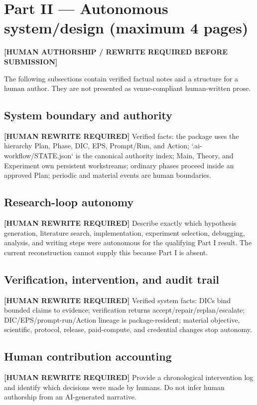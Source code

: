 \documentclass{article}
\begin{document}
\newpage
\section*{Part II --- Autonomous system/design (maximum 4 pages)}
\begin{center}\textbf{[HUMAN AUTHORSHIP / REWRITE REQUIRED BEFORE SUBMISSION]}\end{center}
The following subsections contain verified factual notes and a structure for a human author. They are not presented as venue-compliant human-written prose.

\subsection*{System boundary and authority}
\textbf{[HUMAN REWRITE REQUIRED]} Verified facts: the package uses the hierarchy Plan, Phase, DIC, EPS, Prompt/Run, and Action; `.ai-workflow/STATE.json` is the canonical authority index; Main, Theory, and Experiment own persistent workstreams; ordinary phases proceed inside an approved Plan; periodic and material events are human boundaries.

\subsection*{Research-loop autonomy}
\textbf{[HUMAN REWRITE REQUIRED]} Describe exactly which hypothesis generation, literature search, implementation, experiment selection, debugging, analysis, and writing steps were autonomous for the qualifying Part I result. The current reconstruction cannot supply this because Part I is absent.

\subsection*{Verification, intervention, and audit trail}
\textbf{[HUMAN REWRITE REQUIRED]} Verified system facts: DICs bind bounded claims to evidence; verification returns accept/repair/replan/escalate; DIC/EPS/prompt-run/Action lineage is package-resident; material objective, scientific, protocol, release, paid-compute, and credential changes stop autonomy.

\subsection*{Human contribution accounting}
\textbf{[HUMAN REWRITE REQUIRED]} Provide a chronological intervention log and identify which decisions were made by humans. Do not infer human authorship from an AI-generated narrative.
\end{document}
